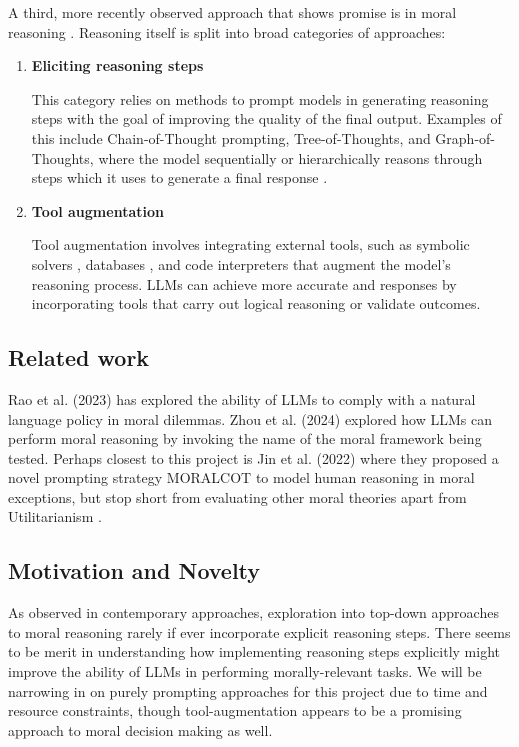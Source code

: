\documentclass{article}
\begin{document}
A third, more recently observed approach that shows promise is in moral reasoning \cite{rao_ethical_2023} \cite{zhou_rethinking_2024}. Reasoning itself is split into broad categories of approaches:
\begin{enumerate}
    \item \textbf{Eliciting reasoning steps} 
    
    This category relies on methods to prompt models in generating reasoning steps with the goal of improving the quality of the final output. Examples of this include Chain-of-Thought prompting, Tree-of-Thoughts, and Graph-of-Thoughts, where the model sequentially or hierarchically reasons through steps which it uses to generate a final response \cite{wei_chain--thought_2023}\cite{yao_tree_2023}\cite{besta_graph_2024}.
    

    \item \textbf{Tool augmentation}
    
    Tool augmentation involves integrating external tools, such as symbolic solvers \cite{pan_logic-lm_2023}, databases \cite{lewis_retrieval-augmented_2021}, and code interpreters \cite{gao_pal_2023} that augment the model's reasoning process. LLMs can achieve more accurate and responses by incorporating tools that carry out logical reasoning or validate outcomes.

\end{enumerate}


\subsection{Related work}

Rao et al. (2023) \cite{rao_ethical_2023} has explored the ability of LLMs to comply with a natural language policy in moral dilemmas. Zhou et al. (2024) \cite{zhou_rethinking_2024} explored how LLMs can perform moral reasoning by invoking the name of the moral framework being tested. Perhaps closest to this project is Jin et al. (2022) \cite{jin_when_2022} where they proposed a novel prompting strategy MORALCOT to model human reasoning in moral exceptions, but stop short from evaluating other moral theories apart from Utilitarianism \cite{bentham_introduction_nodate}.  

\subsection{Motivation and Novelty} \label{motivation}
As observed in contemporary approaches, exploration into top-down approaches to moral reasoning rarely if ever incorporate explicit reasoning steps. There seems to be merit in understanding how implementing reasoning steps explicitly might improve the ability of LLMs in performing morally-relevant tasks. We will be narrowing in on purely prompting approaches for this project due to time and resource constraints, though tool-augmentation appears to be a promising approach to moral decision making as well.
\end{document}
